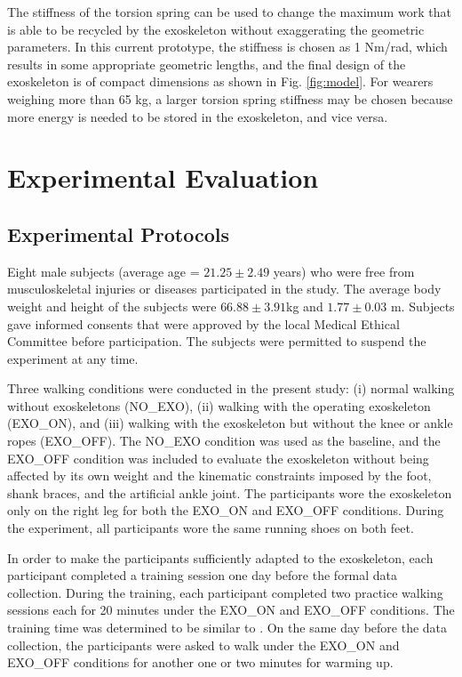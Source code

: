 \documentclass[10pt]{asme2ej}
\begin{document}

The stiffness of the torsion spring can be used to change the maximum work that is able to be recycled by the exoskeleton without exaggerating the geometric parameters.
In this current prototype, the stiffness is chosen as 1 Nm/rad, which results in some appropriate geometric lengths, and the final design of the exoskeleton is of compact dimensions as shown in Fig. \ref{fig:model}.
For wearers weighing more than 65 kg, a larger torsion spring stiffness may be chosen because more energy is needed to be stored in the exoskeleton, and vice versa.

\section{Experimental Evaluation}
\label{sec:experiment}  

\subsection{Experimental Protocols}

Eight male subjects (average age = $21.25 \pm2.49$ years) who were free from musculoskeletal injuries or diseases participated in the study.
The average body weight and height of the subjects were $66.88\pm3.91$kg and $1.77\pm0.03$ m.
Subjects gave informed consents that were approved by the local Medical Ethical Committee before participation.
The subjects were permitted to suspend the experiment at any time. 

Three walking conditions were conducted in the present study: (i) normal walking without exoskeletons (NO\_EXO), (ii) walking with the operating exoskeleton (EXO\_ON), and (iii) walking with the exoskeleton but without the knee or ankle ropes (EXO\_OFF).
The NO\_EXO condition was used as the baseline, and the EXO\_OFF condition was included to evaluate the exoskeleton without being affected by its own weight and the kinematic constraints imposed by the foot, shank braces, and the artificial ankle joint.
The participants wore the exoskeleton only on the right leg for both the EXO\_ON and EXO\_OFF conditions.
During the experiment, all participants wore the same running shoes on both feet. 

In order to make the participants sufficiently adapted to the exoskeleton, each participant completed a training session one day before the formal data collection.
During the training, each participant completed two practice walking sessions each for 20 minutes under the EXO\_ON and EXO\_OFF conditions.
The training time was determined to be similar to \cite{RN5}.
On the same day before the data collection, the participants were asked to walk under the EXO\_ON and EXO\_OFF conditions for another one or two minutes for warming up.
\end{document}
